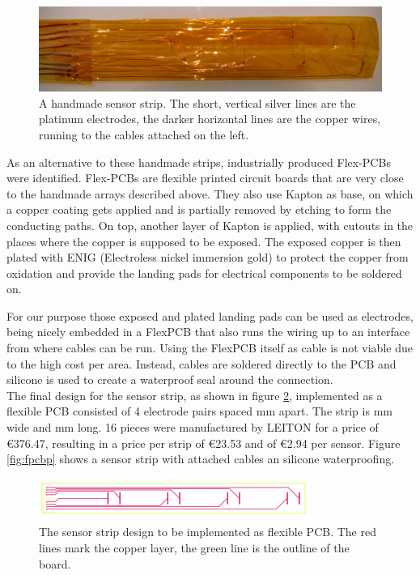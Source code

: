\begin{figure}[H]
	\begin{center}
		\includegraphics[width=\textwidth]{images/v2.jpg} 
		\caption{A handmade sensor strip. The short, vertical silver lines are the platinum electrodes, the darker horizontal lines are the copper wires, running to the cables attached on the left.}
		\label{fig:v2}
	\end{center}
\end{figure}

As an alternative to these handmade strips, industrially produced Flex-PCBs were identified. Flex-PCBs are flexible printed circuit boards that are very close to the handmade arrays described above. They also use Kapton as base, on which a copper coating gets applied and is partially removed by etching to form the conducting paths. On top, another layer of Kapton is applied, with cutouts in the places where the copper is supposed to be exposed. The exposed copper is then plated with ENIG (Electroless nickel immersion gold) to protect the copper from oxidation and provide the landing pads for electrical components to be soldered on.

For our purpose those exposed and plated landing pads can be used as electrodes, being nicely embedded in a FlexPCB that also runs the wiring up to an interface from where cables can be run. Using the FlexPCB itself as cable is not viable due to the high cost per area. Instead, cables are soldered directly to the PCB and silicone is used to create a waterproof seal around the connection.\\

The final design for the sensor strip, as shown in figure \ref{fig:fpcbd}, implemented as a flexible PCB consisted of 4 electrode pairs spaced \unit[50]{mm} apart. The strip is \unit[25]{mm} wide and \unit[220]{mm} long. 16 pieces were manufactured by LEITON for a price of \euro{376.47}, resulting in a price per strip of \euro{23.53} and of \euro{2.94} per sensor. Figure \ref{fig:fpcbp} shows a sensor strip with attached cables an silicone waterproofing.

\begin{figure}
	\begin{center}
		\includegraphics[width=\textwidth]{images/fpcbd.pdf} 
		\caption{The sensor strip design to be implemented as flexible PCB. The red lines mark the copper layer, the green line is the outline of the board.}
		\label{fig:fpcbd}
	\end{center}
\end{figure}

